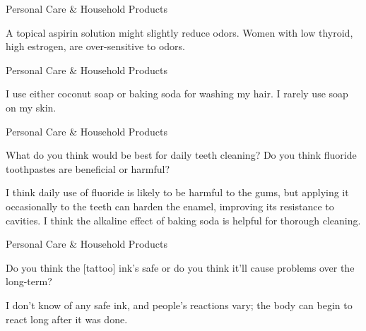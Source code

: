 \documentclass[11pt,oneside,openany,extrafontsizes]{memoir}
\begin{document}
\begin{standalonequote}{Personal Care \& Household Products}

    \begin{answer}
      A topical aspirin solution might slightly reduce odors. Women with low thyroid, high estrogen, are over-sensitive to odors.
    \end{answer}
\end{standalonequote}

\begin{standalonequote}{Personal Care \& Household Products}

    \begin{answer}
      I use either coconut soap or baking soda for washing my hair. I rarely use soap on my skin.
    \end{answer}
\end{standalonequote}

\begin{qaexchange}{Personal Care \& Household Products}

    \begin{question}
         What do you think would be best for daily teeth cleaning? Do you think fluoride toothpastes are beneficial or harmful?
    \end{question}

    \begin{answer}
       I think daily use of fluoride is likely to be harmful to the gums, but applying it occasionally to the teeth can harden the enamel, improving its resistance to cavities. I think the alkaline effect of baking soda is helpful for thorough cleaning. 
    \end{answer}
\end{qaexchange}

\begin{qaexchange}{Personal Care \& Household Products}

    \begin{question}
      Do you think the [tattoo] ink's safe or do you think it'll cause problems over the long-term?
    \end{question}

    \begin{answer}
      I don't know of any safe ink, and people's reactions vary; the body can begin to react long after it was done.
    \end{answer}
\end{qaexchange}
\end{document}
